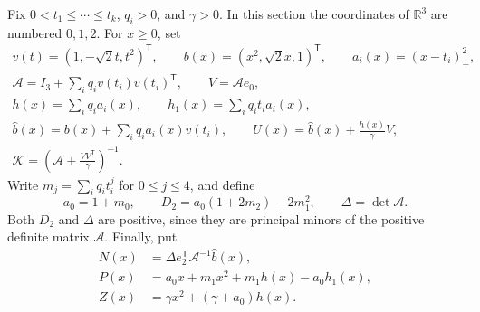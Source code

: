\documentclass[11pt]{article}
\theoremstyle{remark}
\newcommand{\R}{\mathbb R}
\begin{document}
Fix $0<t_1\le\cdots\le t_k$, $q_i>0$, and $\gamma>0$.
In this section the coordinates of $\R^3$ are numbered $0,1,2$.
For $x\ge0$, set
\[
\begin{gathered}
 v(t)=(1,-\sqrt2t,t^2)^{\mathsf T},\qquad
 b(x)=(x^2,\sqrt2x,1)^{\mathsf T},\qquad a_i(x)=(x-t_i)_+^2,\\
 \mathcal A=I_3+\sum_iq_iv(t_i)v(t_i)^{\mathsf T},\qquad V=\mathcal A e_0,\\
 h(x)=\sum_iq_i a_i(x),\qquad h_1(x)=\sum_iq_it_i a_i(x),\\
 \widehat b(x)=b(x)+\sum_iq_i a_i(x)v(t_i),\qquad
 U(x)=\widehat b(x)+\frac{h(x)}\gamma V,\\
 \mathcal K=\left(\mathcal A+\frac{VV^{\mathsf T}}\gamma\right)^{-1}.
\end{gathered}
\]
Write $m_j=\sum_iq_it_i^j$ for $0\le j\le4$, and define
\[
 a_0=1+m_0,\qquad D_2=a_0(1+2m_2)-2m_1^2,\qquad
 \Delta=\det\mathcal A.
\]
Both $D_2$ and $\Delta$ are positive, since they are principal minors of the
positive definite matrix $\mathcal A$.
Finally, put
\begin{equation}\label{eq:functions}
\begin{aligned}
 N(x)&=\Delta e_2^{\mathsf T}\mathcal A^{-1}\widehat b(x),\\
 P(x)&=a_0x+m_1x^2+m_1h(x)-a_0h_1(x),\\
 Z(x)&=\gamma x^2+(\gamma+a_0)h(x).
\end{aligned}
\end{equation}
\end{document}
